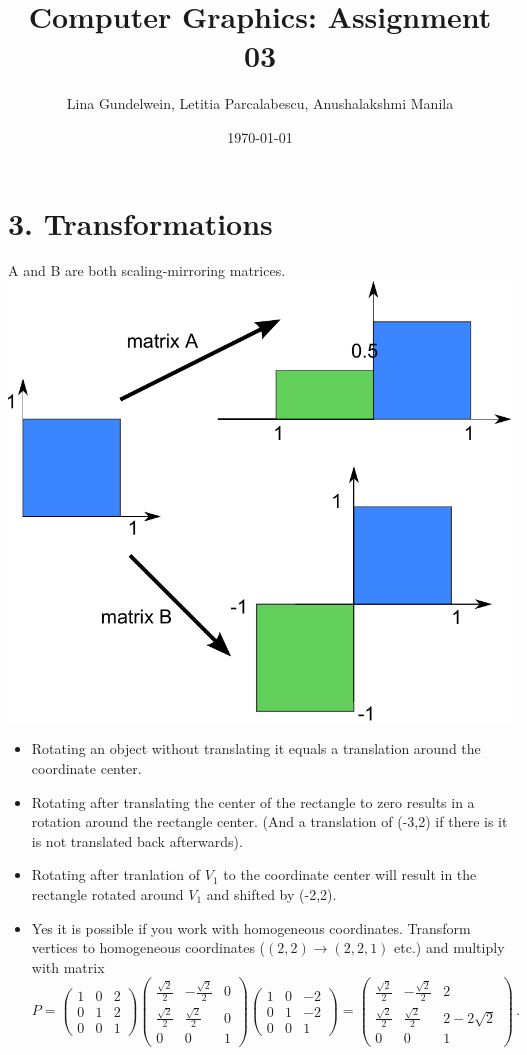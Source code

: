 \documentclass{article}
\title{Computer Graphics: Assignment 03} %
\author{Lina Gundelwein, Letitia Parcalabescu, Anushalakshmi Manila} %
\date{\today} %
\begin{document}
\maketitle 

\section*{3. Transformations} 

A and B are both scaling-mirroring matrices. \\
\includegraphics[width=0.5\linewidth]{drawing} \\

\begin{itemize}
\item Rotating an object without translating it equals a translation around the coordinate center.
\item Rotating after translating the center of the rectangle to zero results in a rotation around the rectangle center. (And a translation of (-3,2) if there is it is not translated back afterwards).
\item Rotating after tranlation of $V_1$ to the coordinate center will result in the rectangle rotated around $V_1$ and shifted by (-2,2).
\item Yes it is possible if you work with homogeneous coordinates. Transform vertices to homogeneous coordinates ($(2,2) \rightarrow (2,2,1)$ etc.) and multiply with matrix
\begin{equation*}
P = 
\begin{pmatrix}
1 & 0 &2\\
0 & 1 & 2\\
0 & 0 & 1
\end{pmatrix}
\begin{pmatrix}
\frac{\sqrt{2}}{2} & - \frac{\sqrt{2}}{2} & 0\\
\frac{\sqrt{2}}{2} &  \frac{\sqrt{2}}{2} & 0\\
0 & 0 & 1
\end{pmatrix}
\begin{pmatrix}
1 & 0 &-2\\
0 & 1 &-2\\
0 & 0 & 1
\end{pmatrix}=
\begin{pmatrix}
\frac{\sqrt{2}}{2} & - \frac{\sqrt{2}}{2} & 2\\
\frac{\sqrt{2}}{2} &  \frac{\sqrt{2}}{2} & 2-2\sqrt{2}\\
0 & 0 & 1
\end{pmatrix}\,.
\end{equation*}
\end{itemize}
\end{document}
